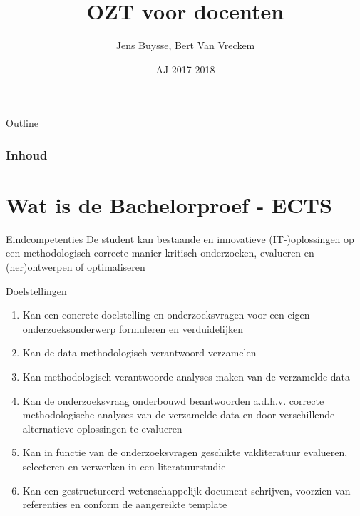 \documentclass{beamer}
\title[Intro]{OZT voor docenten}
\author{Jens Buysse, Bert {Van Vreckem}}
\date{AJ 2017-2018}
\begin{document}


\HoGentLogo

\titleframe


\begin{frame}[allowframebreaks]{Outline}
  \frametitle{Inhoud}

  \tableofcontents
\end{frame}

\section{Wat is de Bachelorproef - ECTS}

\begin{frame}{}
	
	\begin{alertblock}{Eindcompetenties}
			De student kan bestaande en innovatieve (IT-)oplossingen op een methodologisch correcte manier kritisch onderzoeken, evalueren en (her)ontwerpen of optimaliseren
	\end{alertblock}

\end{frame}

\begin{frame}{Doelstellingen}
	\begin{enumerate}
		\item Kan een \textcolor{HoGentAccent1}{concrete doelstelling} en onderzoeksvragen voor een eigen onderzoeksonderwerp formuleren en verduidelijken 
		\item Kan de data \textcolor{HoGentAccent1}{methodologisch verantwoord} verzamelen 
		\item Kan \textcolor{HoGentAccent1}{methodologisch verantwoorde} analyses maken van de verzamelde data 
		\item Kan de onderzoeksvraag onderbouwd beantwoorden a.d.h.v. correcte methodologische analyses van de verzamelde data en door \textcolor{HoGentAccent1}{verschillende alternatieve oplossingen} te evalueren 
		\item Kan in functie van de onderzoeksvragen \textcolor{HoGentAccent1}{geschikte vakliteratuur} evalueren, selecteren en verwerken in een literatuurstudie 
		\item Kan een \textcolor{HoGentAccent1}{gestructureerd wetenschappelijk document} schrijven, voorzien van \textcolor{HoGentAccent1}{referenties} en conform de aangereikte template
	\end{enumerate}
\end{frame}
\end{document}
